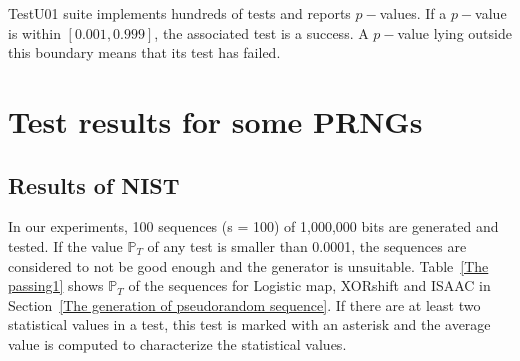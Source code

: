 TestU01 suite implements hundreds of tests and reports $p-$values. If a $p-$value is within $[0.001,0.999]$, the associated test is a success. A $p-$value lying outside this boundary means that its test has failed. %



\section{Test results for some PRNGs}

\subsection{Results of NIST}

In our experiments, 100 sequences (s = 100) of 1,000,000 bits are generated and tested. If the value $\mathbb{P}_T$ of any test is smaller than 0.0001, the sequences are considered to not be good enough and the generator is unsuitable. Table~\ref{The passing1} shows $\mathbb{P}_T$ of the sequences for Logistic map, XORshift and ISAAC in Section~\ref{The generation of pseudorandom sequence}. If there are at least two statistical values in a test, this test is marked with an asterisk and the average value is computed to characterize the statistical values. 


